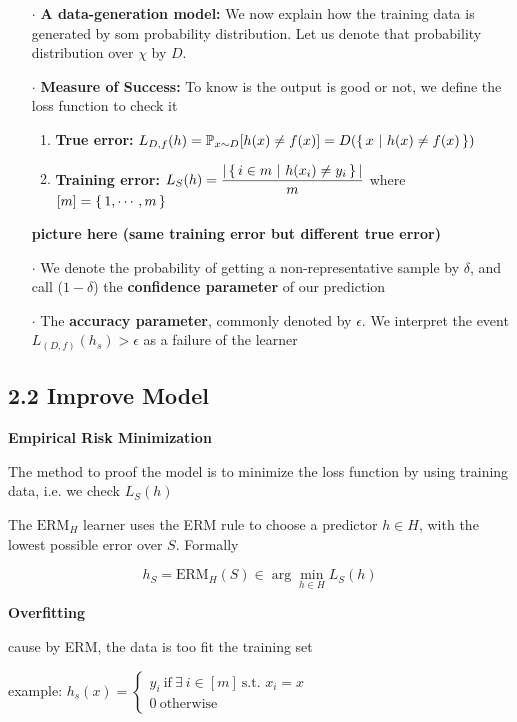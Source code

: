 \begin{enumerate}
	\item[$\cdot$] \textbf{A data-generation model:} We now explain how the training data is generated by som probability distribution. Let us denote that probability distribution over $\chi$ by $D$.
	\item[$\cdot$] \textbf{Measure of Success:} To know is the output is good or not, we define the loss function to check it
	\begin{enumerate}
		\item \textbf{True error:} $L_{D,f}(h) = \mathbb{P}_{x\sim D}[h(x) \neq f(x)] = D(\left\{ \,x ~|~ h(x) \neq f(x) \,\right\})$
		\item \textbf{Training error:} $L_S(h) = \dfrac{|\left\{ \,i \in m ~|~ h(x_i) \neq y_i \,\right\} |}{m}$ where $[m] = \left\{ \,1,\cdots,m \,\right\}$
	\end{enumerate}
	
	\textbf{\color{red} picture here \color{black} (same training error but different true error)}
	
	\item[$\cdot$] We denote the probability of getting a non-representative sample by $\delta$, and call ($1 - \delta$) the \textbf{confidence parameter} of our prediction
	\item[$\cdot$] The \textbf{accuracy parameter}, commonly denoted by $\epsilon$. We interpret the event $L_{(D,f)}(h_s) > \epsilon$ as a failure of the learner
\end{enumerate}

\newpage

\subsection*{2.2 Improve Model} $ $\\

\textbf{Empirical Risk Minimization}

The method to proof the model is to minimize the loss function by using training data, i.e. we check $L_S(h)$

The $\text{ERM}_H$ learner uses the ERM rule to choose a predictor $h \in H$, with the lowest possible error over $S$. Formally

$$h_S = \text{ERM}_H(S) \in \arg\min_{h \in H}L_S(h)$$

\textbf{Overfitting}

cause by ERM, the data is too fit the training set

example: $h_s(x) = \begin{cases}
	y_i~\text{if}~\exists~i \in [m]~\text{s.t. } x_i = x\\
	0~\text{otherwise}
\end{cases}$

